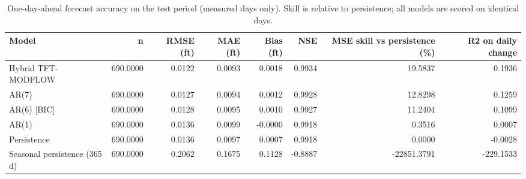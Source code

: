 \begin{table}[htbp]
\centering
\caption{One-day-ahead forecast accuracy on the test period (measured days only). Skill is relative to persistence; all models are scored on identical days.}
\label{tab:benchmarks_test_measured_days}
\begin{tabular}{lrrrrrrr}
\hline
Model & n & RMSE (ft) & MAE (ft) & Bias (ft) & NSE & MSE skill vs persistence (\%) & R2 on daily change \\
\hline
Hybrid TFT-MODFLOW & 690.0000 & 0.0122 & 0.0093 & 0.0018 & 0.9934 & 19.5837 & 0.1936 \\
AR(7) & 690.0000 & 0.0127 & 0.0094 & 0.0012 & 0.9928 & 12.8298 & 0.1259 \\
AR(6) [BIC] & 690.0000 & 0.0128 & 0.0095 & 0.0010 & 0.9927 & 11.2404 & 0.1099 \\
AR(1) & 690.0000 & 0.0136 & 0.0099 & -0.0000 & 0.9918 & 0.3516 & 0.0007 \\
Persistence & 690.0000 & 0.0136 & 0.0097 & 0.0007 & 0.9918 & 0.0000 & -0.0028 \\
Seasonal persistence (365 d) & 690.0000 & 0.2062 & 0.1675 & 0.1128 & -0.8887 & -22851.3791 & -229.1533 \\
\hline
\end{tabular}
\end{table}